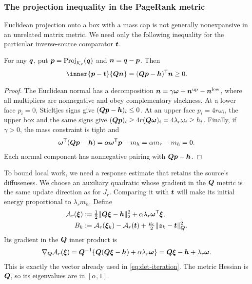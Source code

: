\subsubsection{The projection inequality in the PageRank metric}

Euclidean projection onto a box with a mass cap is not generally
nonexpansive in an unrelated matrix metric. We need only the following
inequality for the particular inverse-source comparator $\bm{t}$.

\begin{lemma}
\label{lem:det-sector}
For any $\bm{q}$, put $\bm{p}=\operatorname{Proj}_{\mathcal{K}_r}(\bm{q})$ and
$\bm{n}=\bm{q}-\bm{p}$. Then
\begin{equation*}
 \inner{\vp-\vt}{\mQ\vn}
       =(\mQ\vp-\vh)^\trans\vn\geq0.
\end{equation*}
\end{lemma}
\begin{proof}
The Euclidean normal has a decomposition
$\bm{n}=\gamma\bm{\omega}+\bm{n}^{\mathrm{up}}-\bm{n}^{\mathrm{low}}$,
where all multipliers are nonnegative and obey complementary slackness.
At a lower face $p_i=0$, Stieltjes signs give
$(\bm{Q}\bm{p}-\bm{h})_i\leq0$. At an upper face $p_i=4r\omega_i$,
the upper box and the same signs give
$(\bm{Q}\bm{p})_i\geq4r(\bm{Q}\bm{\omega})_i=4\lambda_r\omega_i\geq h_i$.
Finally, if $\gamma>0$, the mass constraint is tight and
\[
 \bm{\omega}^{\mathsf{T}}(\bm{Q}\bm{p}-\bm{h})
 =\alpha\bm{\omega}^{\mathsf{T}}\bm{p}-m_h=\alpha m_r-m_h=0.
\]
Each normal component has nonnegative pairing with $\bm{Q}\bm{p}-\bm{h}$.
\end{proof}

To bound local work, we need a response estimate that retains the source's
diffuseness. We choose an auxiliary quadratic whose gradient in the $\bm{Q}$
metric is the same update direction as for $J_r$. Comparing it with $\bm{t}$
will make its initial energy proportional to $\lambda_r m_h$. Define
\begin{equation}
 \begin{aligned}
 \mathcal A_r(\bm{\xi})&:=\tfrac12\lVert\bm{Q}\bm{\xi}-\bm{h}\rVert_2^2
                  +\alpha\lambda_r\bm{\omega}^{\mathsf{T}}\bm{\xi},\\
 B_k&:=\mathcal A_r(\bm{\xi}_k)-\mathcal A_r(\bm{t})
                  +\tfrac{\mu_{\mathrm{c}}}2\lVert\bm{z}_k-\bm{t}\rVert_{\bm{Q}}^2.
 \end{aligned}
 \label{eq:det-second-energy}
\end{equation}
Its gradient in the $\bm{Q}$ inner product is
\begin{equation}
 \nabla_{\bm{Q}}\mathcal A_r(\bm{\xi})
 =\bm{Q}^{-1}\{\bm{Q}(\bm{Q}\bm{\xi}-\bm{h})+\alpha\lambda_r\bm{\omega}\}
 =\bm{Q}\bm{\xi}-\bm{h}+\lambda_r\bm{\omega}.
 \label{eq:det-metric-gradient}
\end{equation}
This is exactly the vector already used in \cref{eq:det-iteration}.
The metric Hessian is $\bm{Q}$, so its eigenvalues are in $[\alpha,1]$.

